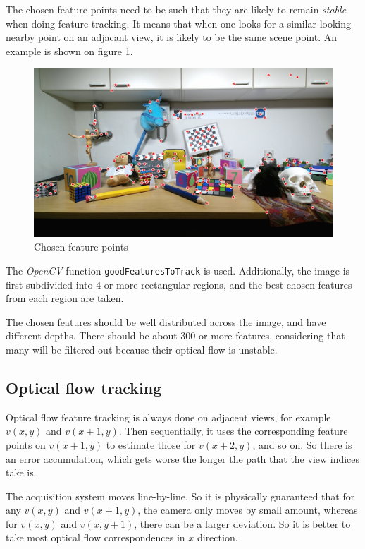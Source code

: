 \documentclass{scrreprt}
\begin{document}
The chosen feature points need to be such that they are likely to remain \emph{stable} when doing feature tracking. It means that when one looks for a similar-looking nearby point on an adjacant view, it is likely to be the same scene point. An example is shown on figure \ref{fig:choosefeatures}.

\begin{figure}
\includegraphics[width=\textwidth]{choosefeatures.png}
\caption{Chosen feature points}
\label{fig:choosefeatures}
\end{figure}

The \emph{OpenCV} function \texttt{goodFeaturesToTrack} is used. Additionally, the image is first subdivided into 4 or more rectangular regions, and the best chosen features from each region are taken.

The chosen features should be well distributed across the image, and have different depths. There should be about $300$ or more features, considering that many will be filtered out because their optical flow is unstable.


\subsection{Optical flow tracking}
Optical flow feature tracking is always done on adjacent views, for example $v(x,y)$ and $v(x+1,y)$. Then sequentially, it uses the corresponding feature points on $v(x+1,y)$ to estimate those for $v(x+2,y)$, and so on. So there is an error accumulation, which gets worse the longer the path that the view indices take is.

The acquisition system moves line-by-line. So it is physically guaranteed that for any $v(x,y)$ and $v(x+1,y)$, the camera only moves by small amount, whereas for $v(x,y)$ and $v(x,y+1)$, there can be a larger deviation. So it is better to take most optical flow correspondences in $x$ direction.
\end{document}
